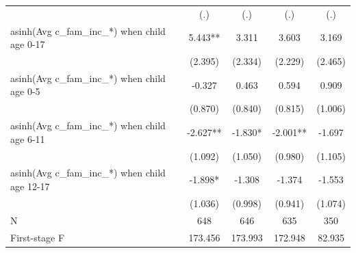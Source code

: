 \begin{table}[ht!]
{\begin{tabular}{l*{4}{c}}
                    &         (.)   &         (.)   &         (.)   &         (.)   \\
asinh(Avg c\_fam\_inc\_*) when child age 0-17&       5.443** &       3.311   &       3.603   &       3.169   \\
                    &     (2.395)   &     (2.334)   &     (2.229)   &     (2.465)   \\
asinh(Avg c\_fam\_inc\_*) when child age 0-5&      -0.327   &       0.463   &       0.594   &       0.909   \\
                    &     (0.870)   &     (0.840)   &     (0.815)   &     (1.006)   \\
asinh(Avg c\_fam\_inc\_*) when child age 6-11&      -2.627** &      -1.830*  &      -2.001** &      -1.697   \\
                    &     (1.092)   &     (1.050)   &     (0.980)   &     (1.105)   \\
asinh(Avg c\_fam\_inc\_*) when child age 12-17&      -1.898*  &      -1.308   &      -1.374   &      -1.553   \\
                    &     (1.036)   &     (0.998)   &     (0.941)   &     (1.074)   \\
\midrule
N                   &         648   &         646   &         635   &         350   \\
First-stage F       &     173.456   &     173.993   &     172.948   &      82.935   \\
\bottomrule \end{tabular}}
\vspace{0.2cm} 
\end{table}

